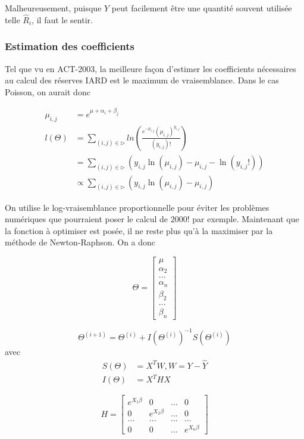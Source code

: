 \documentclass[11pt,french]{report}
\begin{document}
Malheureusement, puisque $Y$ peut facilement être une quantité souvent utilisée telle $\widehat{R}_i$, il faut le sentir.

\subsubsection*{Estimation des coefficients}

Tel que vu en ACT-2003, la meilleure façon d'estimer les coefficients nécessaires au calcul des réserves IARD est le maximum de vraisemblance. Dans le cas Poisson, on aurait donc

$$\begin{aligned}
\mu_{i,j} &= e^{\mu + \alpha_i + \beta_j} \\
l(\Theta) &= \sum_{(i,j) \in \rhd} ln\left(\frac{e^{-\mu_{i,j}}(\mu_{i,j})^{y_{i,j}}}{(y_{i,j})!} \right) \\
 &= \sum_{(i,j) \in \rhd} \left(y_{i,j} \ln(\mu_{i,j}) - \mu_{i,j} - \ln(y_{i,j}!) \right) \\
 &\propto \sum_{(i,j) \in \rhd} \left(y_{i,j}\ln(\mu_{i,j}) - \mu_{i,j} \right)
\end{aligned}$$

On utilise le log-vraisemblance proportionnelle pour éviter les problèmes numériques que pourraient poser le calcul de $2000!$ par exemple. 
Maintenant que la fonction à optimiser est posée, il ne reste plus qu'à la maximiser par la méthode de Newton-Raphson. On a donc

\[
\Theta = 
\begin{bmatrix}
\mu \\
\alpha_2 \\
... \\
\alpha_n \\
\beta_2 \\
... \\
\beta_n
\end{bmatrix}
\]

$$\boxed{\Theta^{(i+1)}=\Theta^{(i)}+I(\Theta^{(i)})^{-1}S(\Theta^{(i)})}$$
avec
$$\boxed{\begin{aligned}
S(\Theta) &= X^T W,W=Y-\widehat Y \\
I(\Theta) &=X^T H X
\end{aligned}}$$

\[
H = 
\begin{bmatrix}
e^{X_1 \beta} & 0 & ... & 0 \\
0 & e^{X_2 \beta} & ... & 0 \\
... & ... & ... & ... \\
0 & 0 & ... & e^{X_n \beta}
\end{bmatrix}
\]
\end{document}
